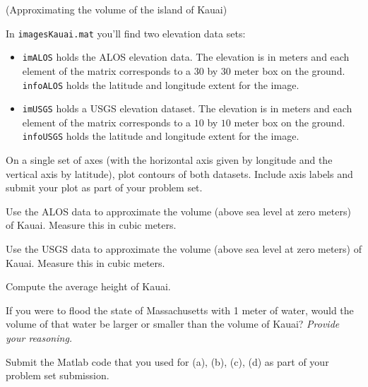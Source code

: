 \documentclass[12pt,letterpaper,noanswers]{exam}
\begin{document}
\begin{questions}


\question (Approximating the volume of the island of Kauai)

In \texttt{imagesKauai.mat} you'll find two elevation data sets:
\begin{itemize}
    \item \texttt{imALOS} holds the ALOS elevation data.  The elevation is in meters and each element of the matrix corresponds to a $30$ by $30$ meter box on the ground.  \texttt{infoALOS} holds the latitude and longitude extent for the image.
    \item \texttt{imUSGS} holds a USGS elevation dataset.  The elevation is in meters and each element of the matrix corresponds to a $10$ by $10$ meter box on the ground.  \texttt{infoUSGS} holds the latitude and longitude extent for the image.
\end{itemize}

\begin{parts}
\item On a single set of axes (with the horizontal axis given by longitude and the vertical axis by latitude), plot contours of both datasets.  Include axis labels and submit your plot as part of your problem set.
\item Use the ALOS data to approximate the volume (above sea level at zero meters) of Kauai.  Measure this in cubic meters.
\item Use the USGS data to approximate the volume (above sea level at zero meters) of Kauai.  Measure this in cubic meters.
\item Compute the average height of Kauai.
\item If you were to flood the state of Massachusetts with 1 meter of water, would the volume of that water be larger or smaller than the volume of Kauai?  \emph{Provide your reasoning.}
\item Submit the Matlab code that you used for (a), (b), (c), (d) as part of your problem set submission.
\end{parts}



\end{questions}
\end{document}
